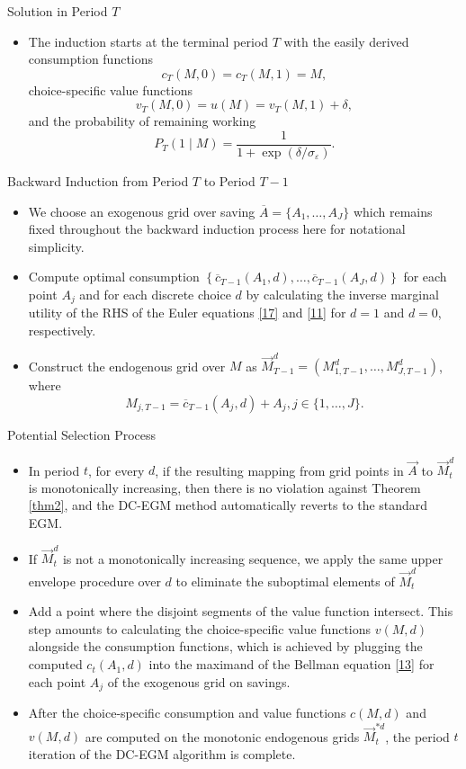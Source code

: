 \documentclass[aspectratio=169]{beamer}
\begin{document}
\begin{frame}{Solution in Period $T$}
	\begin{itemize}
		\item The induction starts at the terminal period $T$ with the easily derived consumption functions $$c_T(M,0) = c_T(M, 1) = M, $$ choice-specific value functions $$v_T(M, 0) = u(M) = v_T(M,1) + \delta, $$ and the probability of remaining working $$P_{T}(1 \mid M) = \frac{1}{1 + \exp (\delta / \sigma_\varepsilon)}.$$
	\end{itemize}
\end{frame}

\begin{frame}{Backward Induction from Period $T$ to Period $T-1$}
	\begin{itemize}
		\item We choose an exogenous grid over saving $\overline{A} = \{A_1, \ldots, A_J\}$ which remains fixed throughout the backward induction process here for notational simplicity. 
		\item Compute optimal consumption $\left\{ \overline{c}_{T-1} (A_1, d), \ldots, \overline{c}_{T-1}(A_J, d) \right\}$ for each point $A_j$ and for each discrete choice $d$ by calculating the inverse marginal utility of the RHS of the Euler equations \ref{17} and \ref{11} for $d=1$ and $d=0$, respectively.
		\item Construct the endogenous grid over $M$ as $\overrightarrow{M}_{T-1}^d = ({M}_{1, T-1}^d, \ldots, {M}_{J, T-1}^d)$, where $$M_{j, T-1} = \overline{c}_{T-1}(A_j, d) + A_j, j \in \{1, \ldots, J\}.$$
	\end{itemize}
\end{frame}

\begin{frame}{Potential Selection Process}
	\begin{itemize}
		\item In period $t$, for every $d$, if the resulting mapping from grid points in $\overrightarrow{A}$ to $\overrightarrow{M}_t^d$ is monotonically increasing, then there is no violation against Theorem \ref{thm2}, and the DC-EGM method automatically reverts to the standard EGM.
		\item If $\overrightarrow{M}_t^d$ is not a monotonically increasing sequence, we apply the same upper envelope procedure over $d$ to eliminate the suboptimal elements of $\overrightarrow{M}_t^d$ 
		\item Add a point where the disjoint segments of the value function intersect. This step amounts to calculating the choice-specific value functions $v(M,d)$ alongside the consumption functions, which is achieved by plugging the computed $c_t(A_1, d)$ into the maximand of the Bellman equation \ref{13} for each point $A_j$ of the exogenous grid on savings.
		\item After the choice-specific consumption and value functions $c(M, d)$ and $v(M, d)$ are computed on the monotonic endogenous grids $\overrightarrow{M}_t^{*d}$, the period $t$ iteration of the DC-EGM algorithm is complete.
	\end{itemize}
\end{frame}
\end{document}
